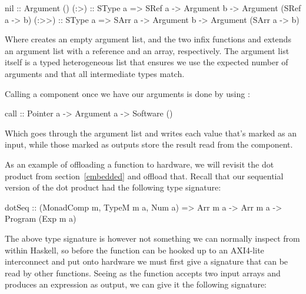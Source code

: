 \documentclass[../paper.tex]{subfiles}
\begin{document}
\begin{code}
nil   :: Argument ()
(:>)  :: SType a => SRef a -> Argument b -> Argument (SRef a -> b)
(:>>) :: SType a => SArr a -> Argument b -> Argument (SArr a -> b)
\end{code}

\noindent Where  creates an empty argument list, and the two infix functions \codei{(:>)} and \codei{(:>>)} extends an argument list with a reference and an array, respectively. The argument list itself is a typed heterogeneous list that ensures we use the expected number of arguments and that all intermediate types match.

Calling a component once we have our arguments is done by using :

\begin{code}
call :: Pointer a -> Argument a -> Software ()
\end{code}

\noindent Which goes through the argument list and writes each value that's marked as an input, while those marked as outputs store the result read from the component.

As an example of offloading a function to hardware, we will revisit the dot product from section~\ref{embedded} and offload that. Recall that our sequential version of the dot product had the following type signature:

\begin{code}
dotSeq :: (MonadComp m, TypeM m a, Num a) => Arr m a -> Arr m a
  -> Program (Exp m a)
\end{code}

\noindent The above type signature is however not something we can normally inspect from within Haskell, so before the function can be hooked up to an AXI4-lite interconnect and put onto hardware we must first give a signature that can be read by other functions. Seeing as the function accepts two input arrays and produces an expression as output, we can give it the following signature:


\end{document}

